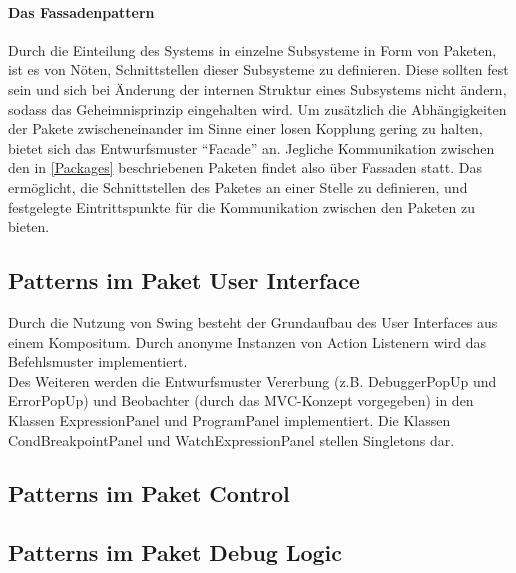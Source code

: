 \documentclass[parskip=full]{scrartcl}
\begin{document}
\paragraph{Das Fassadenpattern}
Durch die Einteilung des Systems in einzelne Subsysteme in Form von Paketen, ist es von Nöten, Schnittstellen dieser Subsysteme zu definieren. Diese sollten fest sein und sich bei Änderung der internen Struktur eines Subsystems nicht ändern, sodass das Geheimnisprinzip eingehalten wird. Um zusätzlich die Abhängigkeiten der Pakete zwischeneinander im Sinne einer losen Kopplung gering zu halten, bietet sich das Entwurfsmuster \enquote{Facade} an. Jegliche Kommunikation zwischen den in \ref{Packages} beschriebenen Paketen findet also über Fassaden statt. Das ermöglicht, die Schnittstellen des Paketes an einer Stelle zu definieren, und festgelegte Eintrittspunkte für die Kommunikation zwischen den Paketen zu bieten.
\subsection{Patterns im Paket User Interface}
Durch die Nutzung von Swing besteht der Grundaufbau des User Interfaces aus einem Kompositum. 
Durch anonyme Instanzen von Action Listenern wird das Befehlsmuster implementiert. \\
Des Weiteren werden die Entwurfsmuster Vererbung (z.B. DebuggerPopUp und ErrorPopUp) und Beobachter (durch das MVC-Konzept vorgegeben) in den Klassen ExpressionPanel und ProgramPanel implementiert.
Die Klassen CondBreakpointPanel und WatchExpressionPanel stellen Singletons dar.
\subsection{Patterns im Paket Control}
\subsection{Patterns im Paket Debug Logic}
\end{document}
